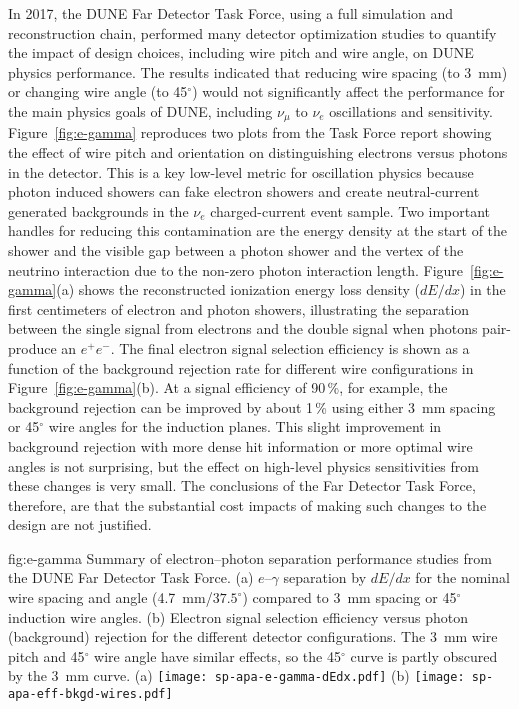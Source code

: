 \begin{itemize}
In 2017, the DUNE Far Detector Task Force, using a full  simulation and reconstruction chain, performed many detector optimization studies to quantify the impact of design choices, including wire pitch and wire angle, on DUNE physics performance.  The results indicated that reducing wire spacing (to \SI{3}{mm}) or changing wire angle (to \num{45}$^\circ$) would not significantly affect the performance for the main physics goals of DUNE, including $\nu_\mu $ to $\nu_e$ oscillations and  sensitivity.  Figure~\ref{fig:e-gamma} reproduces two plots from the Task Force report showing the effect of wire pitch and orientation on distinguishing electrons versus photons in the detector.  This is a key low-level metric for oscillation physics because photon induced showers can fake electron showers and create neutral-current generated backgrounds in the $\nu_e$ charged-current event sample. Two important handles for reducing this contamination are the energy density at the start of the shower and the visible gap between a photon shower and the vertex of the neutrino interaction due to the non-zero photon interaction length.  Figure~\ref{fig:e-gamma}(a) shows the reconstructed ionization energy loss density ($dE/dx$) in the first centimeters of electron and photon showers, illustrating the separation between the single  signal from electrons and the double  signal when photons pair-produce an $e^+e^-$.  The final electron signal selection efficiency is shown as a function of the background rejection rate for different wire configurations in Figure~\ref{fig:e-gamma}(b). At a signal efficiency of \num{90}\,\%, for example, the background rejection can be improved by about \num{1}\,\% using either \SI{3}{mm} spacing or 45$^\circ$ wire angles for the induction planes.  This slight improvement in background rejection with more dense hit information or more optimal wire angles is not surprising, but the effect on high-level physics sensitivities from these changes is very small. The conclusions of the Far Detector Task Force, therefore, are that the substantial cost impacts of making such changes to the  design are not justified.    

\begin{dunefigure}{fig:e-gamma}
{Summary of electron--photon separation performance studies from the DUNE Far Detector Task Force. (a) $e$--$\gamma$ separation by $dE/dx$ for the nominal wire spacing and angle (\SI{4.7}{mm}/$37.5^\circ$) compared to \SI{3}{mm} spacing or 45$^\circ$ induction wire angles. (b) Electron signal selection efficiency versus photon (background) rejection for the different detector configurations. The \SI{3}{mm} wire pitch and 45$^\circ$ wire angle have similar effects, so the 45$^\circ$ curve is partly obscured by the \SI{3}{mm} curve.}
(a)
\texttt{[image: sp-apa-e-gamma-dEdx.pdf]} \qquad
(b)
\texttt{[image: sp-apa-eff-bkgd-wires.pdf]} 
\end{dunefigure}


\end{itemize}

